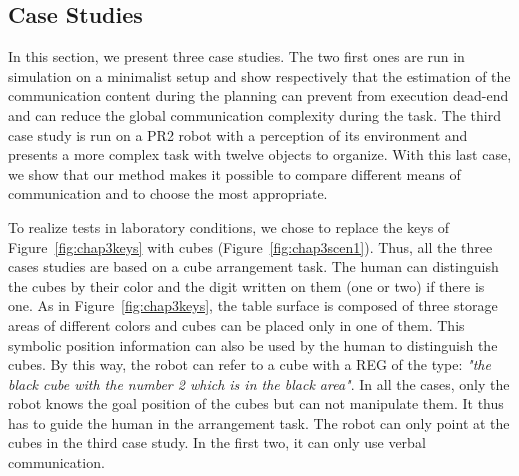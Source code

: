 \documentclass[a4paper,11pt,twoside]{StyleThese}
\begin{document}
\subsection{Case Studies}
\label{sec:Case_studies}

In this section, we present three case studies. The two first ones are run in simulation on a minimalist setup and show respectively that the estimation of the communication content during the planning can prevent from execution dead-end and can reduce the global communication complexity during the task. The third case study is run on a PR2 robot with a perception of its environment and presents a more complex task with twelve objects to organize. With this last case, we show that our method makes it possible to compare different means of communication and to choose the most appropriate.

To realize tests in laboratory conditions, we chose to replace the keys of Figure~\ref{fig:chap3keys} with cubes (Figure~\ref{fig:chap3scen1}). Thus, all the three cases studies are based on a cube arrangement task. The human can distinguish the cubes by their color and the digit written on them (one or two) if there is one. As in Figure~\ref{fig:chap3keys}, the table surface is composed of three storage areas of different colors and cubes can be placed only in one of them. This symbolic position information can also be used by the human to distinguish the cubes. By this way, the robot can refer to a cube with a REG of the type: \textit{"the black cube with the number 2 which is in the black area"}. In all the cases, only the robot knows the goal position of the cubes but can not manipulate them. It thus has to guide the human in the arrangement task. The robot can only point at the cubes in the third case study. In the first two, it can only use verbal communication.
\end{document}
